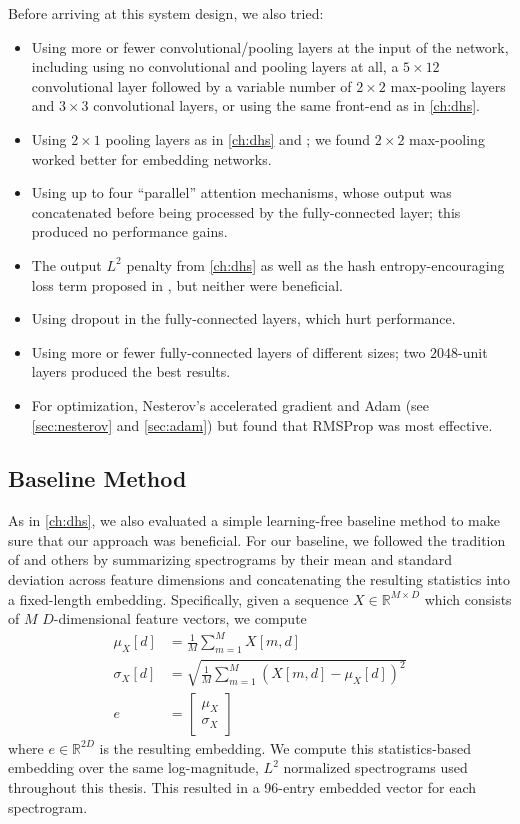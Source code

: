 Before arriving at this system design, we also tried:
\begin{itemize}
\item Using more or fewer convolutional/pooling layers at the input of the network, including using no convolutional and pooling layers at all, a $5 \times 12$ convolutional layer followed by a variable number of $2 \times 2$ max-pooling layers and $3 \times 3$ convolutional layers, or using the same front-end as in \cref{ch:dhs}.
\item Using $2 \times 1$ pooling layers as in \cref{ch:dhs} and \cite{humphrey2012rethinking}; we found $2 \times 2$ max-pooling worked better for embedding networks.
\item Using up to four ``parallel'' attention mechanisms, whose output was concatenated before being processed by the fully-connected layer; this produced no performance gains.
\item The output $L^2$ penalty from \cref{ch:dhs} as well as the hash entropy-encouraging loss term proposed in \cite[equation (3)]{yang2015supervised}, but neither were beneficial.
\item Using dropout in the fully-connected layers, which hurt performance.
\item Using more or fewer fully-connected layers of different sizes; two $2048$-unit layers produced the best results.
\item For optimization, Nesterov's accelerated gradient \cite{nesterov1983method} and Adam \cite{kingma2015adam} (see \cref{sec:nesterov} and \cref{sec:adam}) but found that RMSProp was most effective.
\end{itemize}

\subsection{Baseline Method}
\label{sec:embedding_baseline}

As in \cref{ch:dhs}, we also evaluated a simple learning-free baseline method to make sure that our approach was beneficial.
For our baseline, we followed the tradition of \cite{tzanetakis2002musical, deng2008study, mandel2005song, foster2014sequential} and others by summarizing spectrograms by their mean and standard deviation across feature dimensions and concatenating the resulting statistics into a fixed-length embedding.
Specifically, given a sequence $X \in \mathbb{R}^{M \times D}$ which consists of $M$ $D$-dimensional feature vectors, we compute
\begin{align}
\mu_X[d] &= \frac{1}{M} \sum_{m = 1}^M X[m, d]\\
\sigma_X[d] &= \sqrt{\frac{1}{M} \sum_{m = 1}^M (X[m, d] - \mu_X[d])^2}\\
e &= \begin{bmatrix}
\mu_X\\
\sigma_X
\end{bmatrix}
\end{align}
where $e \in \mathbb{R}^{2D}$ is the resulting embedding.
We compute this statistics-based embedding over the same log-magnitude, $L^2$ normalized spectrograms used throughout this thesis.
This resulted in a 96-entry embedded vector for each spectrogram.

